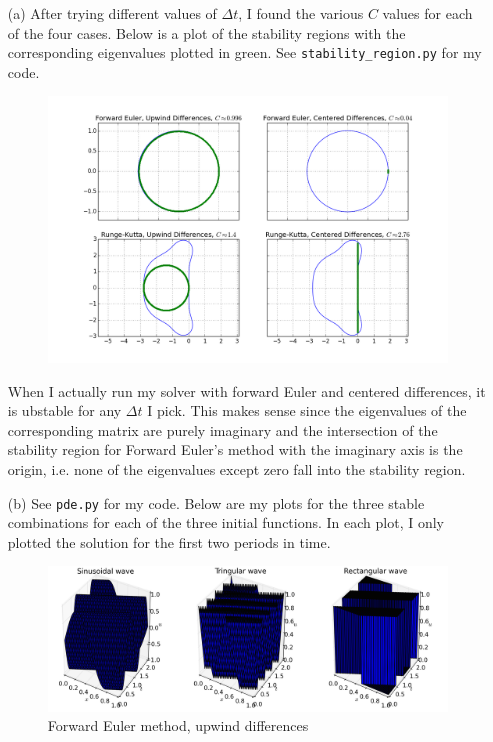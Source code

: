 \documentclass[10pt]{article}
\begin{document}
\begin{itemize}

\item[(a)] After trying different values of $ \Delta t $, I found the various $C$ values for each of the four cases. Below is a plot of the stability regions with the corresponding eigenvalues plotted in green. See \verb+stability_region.py+ for my code. 

\begin{figure}[H]
  \centering
    \includegraphics[scale=0.6]{stability_regions}
\end{figure}

When I actually run my solver with forward Euler and centered differences, it is ubstable for any $\Delta t$ I pick. This makes sense since the eigenvalues of the corresponding matrix are purely imaginary and the intersection of the stability region for Forward Euler's method with the imaginary axis is the origin, i.e. none of the eigenvalues except zero fall into the stability region.

\item[(b)] See \verb+pde.py+ for my code. Below are my plots for the three stable combinations for each of the three initial functions. In each plot, I only plotted the solution for the first two periods in time.

\begin{figure}[H]
  \centering
  \caption{Forward Euler method, upwind differences}
  \vspace{5 mm}
    \includegraphics[scale=0.5]{pde_solution_combo1}
\end{figure}


\end{itemize}
\end{document}
